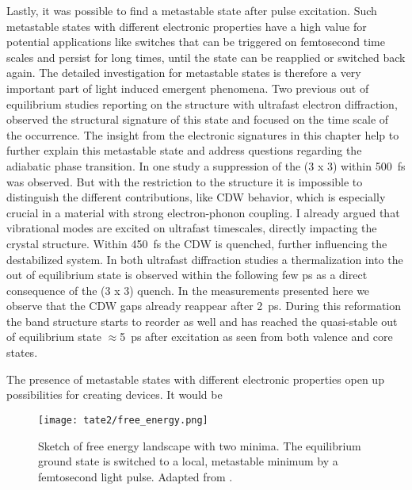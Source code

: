 Lastly, it was possible to find a metastable state after pulse excitation.
Such metastable states with different electronic properties have a high value for potential applications like switches that can be triggered on femtosecond time scales and persist for long times, until the state can be reapplied or switched back again.
The detailed investigation for metastable states is therefore a very important part of light induced emergent phenomena.
Two previous out of equilibrium studies reporting on the structure with ultrafast electron diffraction, observed the structural signature of this state and focused on the time scale of the occurrence.
The insight from the electronic signatures in this chapter help to further explain this metastable state and address questions regarding the adiabatic phase transition.
In one study \cite{domrose_femtosecond_2024} a suppression of the (3 x 3) within \qty{500}{\femto\second} was observed.
But with the restriction to the structure it is impossible to distinguish the different contributions, like CDW behavior, which is especially crucial in a material with strong electron-phonon coupling.
I already argued that vibrational modes are excited on ultrafast timescales, directly impacting the crystal structure.
Within \qty{450}{\femto\second} the CDW is quenched, further influencing the destabilized system.
In both ultrafast diffraction studies a thermalization into the out of equilibrium state is observed within the following few \unit{\pico\second} as a direct consequence of the (3 x 3) quench.
In the measurements presented here we observe that the CDW gaps already reappear after \qty{2}{\pico\second}.
During this reformation the band structure starts to reorder as well and has reached the quasi-stable out of equilibrium state $\approx$\qty{5}{\pico\second} after excitation as seen from both valence and core states.

The presence of metastable states with different electronic properties open up possibilities for creating devices.
It would be

\begin{figure}
	\centering
	\texttt{[image: tate2/free\_energy.png]}
	\caption{Sketch of free energy landscape with two minima. The equilibrium ground state is switched to a local, metastable minimum by a femtosecond light pulse. Adapted from \cite{basov_towards_2017}.}
	\label{fig:free_energy}
\end{figure}

